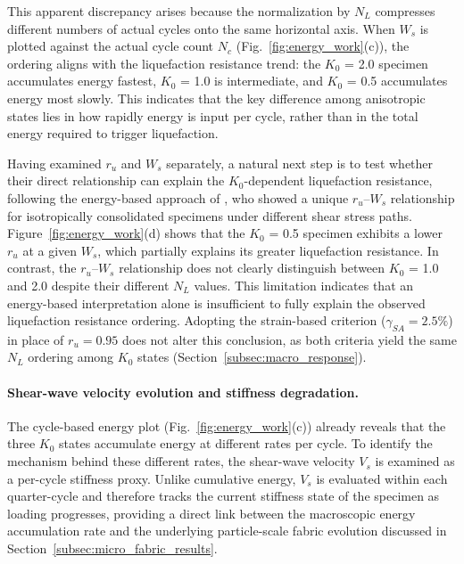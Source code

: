 \documentclass[a4paper,fleqn]{cas-sc}
\makeatletter
\newcommand{\Kzero}{\ensuremath{K_0}}
\newcommand{\Vs}{\ensuremath{V_s}}
\newcommand{\ru}{\ensuremath{r_u}}
\providecommand{\DIFadd}[1]{{\protect\color{blue}\uwave{#1}}} %
\providecommand{\DIFdel}[1]{{\protect\color{red}\sout{#1}}} %
\providecommand{\DIFaddbegin}{} %
\providecommand{\DIFaddend}{} %
\providecommand{\DIFdelbegin}{} %
\providecommand{\DIFdelend}{} %
\let\sout@orig\sout %
\renewcommand{\sout}[1]{\ifmmode\text{\sout@orig{\ensuremath{#1}}}\else\sout@orig{#1}\fi} %
\makeatother
\begin{document}
This apparent discrepancy arises because the normalization by $N_L$ compresses different numbers of actual cycles onto the same horizontal axis. When $W_s$ is plotted against the actual cycle count \DIFdelbegin \DIFdel{$N_c$ }\DIFdelend \DIFaddbegin \DIFadd{$N$ }\DIFaddend (Fig.~\ref{fig:energy_work}(c)), the ordering aligns with the liquefaction resistance trend: the \Kzero{} = 2.0 specimen accumulates energy fastest, \Kzero{} = 1.0 is intermediate, and \Kzero{} = 0.5 accumulates energy most slowly. This indicates that the key difference among anisotropic states lies in how rapidly energy is input per cycle, rather than in the total energy required to trigger liquefaction.

Having examined $\ru$ and $W_s$ separately, a natural next step is to test whether their direct relationship can explain the \Kzero{}-dependent liquefaction resistance, following the energy-based approach of \citet{TowhataIshihara1985}, who showed a unique $\ru$--$W_s$ relationship for isotropically consolidated specimens under different shear stress paths. Figure~\ref{fig:energy_work}(d) shows that the \Kzero{} = 0.5 specimen exhibits a lower $\ru$ at a given $W_s$, which partially explains its greater liquefaction resistance. In contrast, the $\ru$--$W_s$ relationship does not clearly distinguish between \Kzero{} = 1.0 and 2.0 despite their different $N_L$ values. This limitation indicates that an energy-based interpretation alone is insufficient to fully explain the observed liquefaction resistance ordering. Adopting the strain-based criterion ($\gamma_{SA}=2.5\%$) in place of $\ru=0.95$ does not alter this conclusion, as both criteria yield the same $N_L$ ordering among \Kzero{} states (Section~\ref{subsec:macro_response}).

\paragraph{Shear-wave velocity evolution and stiffness degradation.}
The cycle-based energy plot (Fig.~\ref{fig:energy_work}(c)) already reveals that the three \Kzero{} states accumulate energy at different rates per cycle. To identify the mechanism behind these different rates, the shear-wave velocity \Vs{} is examined as a per-cycle stiffness proxy. Unlike cumulative energy, \Vs{} is evaluated within each quarter-cycle and therefore tracks the current stiffness state of the specimen as loading progresses, providing a direct link between the macroscopic energy accumulation rate and the underlying particle-scale fabric evolution discussed in Section~\ref{subsec:micro_fabric_results}.
\end{document}
